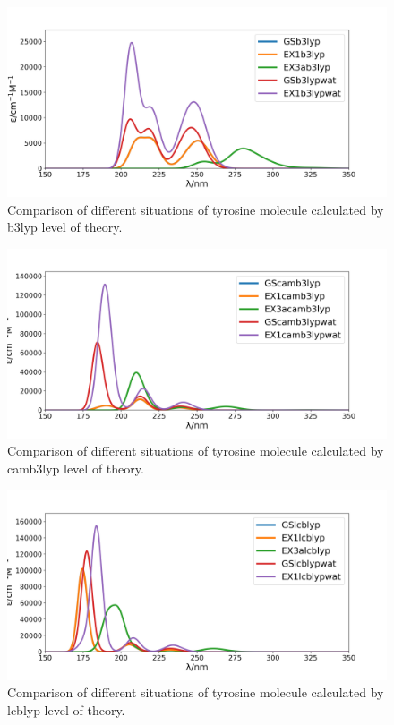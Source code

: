 \documentclass[]{interact}
\theoremstyle{plain}%
\theoremstyle{definition}
\theoremstyle{remark}
\begin{document}
\begin{figure}
	\includegraphics[width=\textwidth]{COMPb3lyp.png} 
	\caption{Comparison of different situations of tyrosine molecule calculated by b3lyp level of theory.}
	\label{COMPb3lyp}
\end{figure}

\begin{figure}
	\includegraphics[width=\textwidth]{COMPcamb3lyp.png} 
	\caption{Comparison of different situations of tyrosine molecule calculated by camb3lyp level of theory.}
	\label{COMPcamb3lyp}
\end{figure}

\begin{figure}
	\includegraphics[width=\textwidth]{COMPlcblyp.png} 
	\caption{Comparison of different situations of tyrosine molecule calculated by lcblyp level of theory.}
	\label{COMPlcblyp}
\end{figure}
\end{document}
